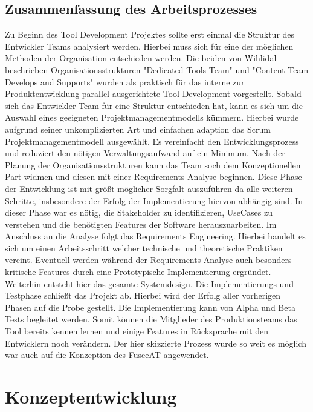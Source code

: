 \documentclass[pagesize, paper=a4, fontsize=12pt, titlepage=true, headings=small, headnosepline, abstractoff, liststotoc, nochapterprefix, plainheadsepline, twoside]{scrreprt}
\begin{document}
\section{Zusammenfassung des Arbeitsprozesses}
Zu Beginn des Tool Development Projektes sollte erst einmal die Struktur des Entwickler Teams analysiert werden. Hierbei muss sich für eine der möglichen Methoden der Organisation entschieden werden. Die beiden von Wihlidal \cite[S. ]{Wihlidal2006} beschrieben Organisationsstrukturen "Dedicated Tools Team" und "Content Team Develops and Supports" wurden als praktisch für das interne zur Produktentwicklung parallel ausgerichtete Tool Development vorgestellt. Sobald sich das Entwickler Team für eine Struktur entschieden hat, kann es sich um die Auswahl eines geeigneten Projektmanagementmodells kümmern. Hierbei wurde aufgrund seiner unkomplizierten Art und einfachen adaption das Scrum Projektmanagementmodell ausgewählt. Es vereinfacht den Entwicklungsprozess und reduziert den nötigen Verwaltungsaufwand auf ein Minimum.
Nach der Planung der Organisationsstrukturen kann das Team soch dem Konzeptionellen Part widmen und diesen mit einer Requirements Analyse beginnen. Diese Phase der Entwicklung ist mit größt möglicher Sorgfalt auszuführen da alle weiteren Schritte, insbesondere der Erfolg der Implementierung hiervon abhängig sind. In dieser Phase war es nötig, die Stakeholder zu identifizieren, UseCases zu verstehen und die benötigten Features der Software herauszuarbeiten. Im Anschluss an die Analyse folgt das Requirements Engineering. Hierbei handelt es sich um einen Arbeitsschritt welcher technische und theoretische Praktiken vereint. Eventuell werden während der Requirements Analyse auch besonders kritische Features durch eine Prototypische Implementierung ergründet. Weiterhin entsteht hier das gesamte Systemdesign.
Die Implementierungs und Testphase schließt das Projekt ab. Hierbei wird der Erfolg aller vorherigen Phasen auf die Probe gestellt. Die Implementierung kann von Alpha und Beta Tests begleitet werden. Somit können die Mitglieder des Produktionsteams das Tool bereits kennen lernen und einige Features in Rücksprache mit den Entwicklern noch verändern.
Der hier skizzierte Prozess wurde so weit es möglich war auch auf die Konzeption des FuseeAT angewendet.

\chapter{Konzeptentwicklung}
\end{document}
